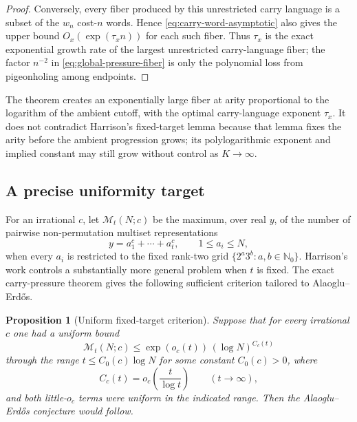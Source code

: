 \documentclass[11pt,oneside]{article}
\newtheorem{proposition}[theorem]{Proposition}
\theoremstyle{definition}
\newcommand{\N}{\mathbb{N}}
\begin{document}
\begin{proof}
Conversely, every fiber produced by this unrestricted carry language is a subset of the $w_n$ cost-$n$ words.  Hence \eqref{eq:carry-word-asymptotic} also gives the upper bound $O_x(\exp(\tau_x n))$ for each such fiber.  Thus $\tau_x$ is the exact exponential growth rate of the largest unrestricted carry-language fiber; the factor $n^{-2}$ in \eqref{eq:global-pressure-fiber} is only the polynomial loss from pigeonholing among endpoints.
\end{proof}

\begin{roadblockbox}
The theorem creates an exponentially large fiber at arity proportional to the logarithm of the ambient cutoff, with the optimal carry-language exponent $\tau_x$.  It does not contradict Harrison's fixed-target lemma because that lemma fixes the arity before the ambient progression grows; its polylogarithmic exponent and implied constant may still grow without control as $K\to\infty$.
\end{roadblockbox}

\subsection{A precise uniformity target}

For an irrational $c$, let $\mathcal M_t(N;c)$ be the maximum, over real $y$, of the number of pairwise non-permutation multiset representations
\[
       y=a_1^c+\cdots+a_t^c,
       \qquad 1\le a_i\le N,
\]
when every $a_i$ is restricted to the fixed rank-two grid
$\{2^a3^b:a,b\in\N_0\}$.  Harrison's work controls a substantially more general problem when $t$ is fixed.  The exact carry-pressure theorem gives the following sufficient criterion tailored to Alaoglu--Erd\H{o}s.

\begin{proposition}[Uniform fixed-target criterion]\label{prop:uniformcriterion}
Suppose that for every irrational $c$ one had a uniform bound
\[
       \mathcal M_t(N;c)
       \le \exp(o_c(t))\,(\log N)^{C_c(t)}
\]
through the range $t\le C_0(c)\log N$ for some constant $C_0(c)>0$, where
\[
       C_c(t)=o_c\!\left(\frac{t}{\log t}\right)
       \qquad(t\to\infty),
\]
and both little-$o_c$ terms were uniform in the indicated range.  Then the Alaoglu--Erd\H{o}s conjecture would follow.
\end{proposition}
\end{document}
